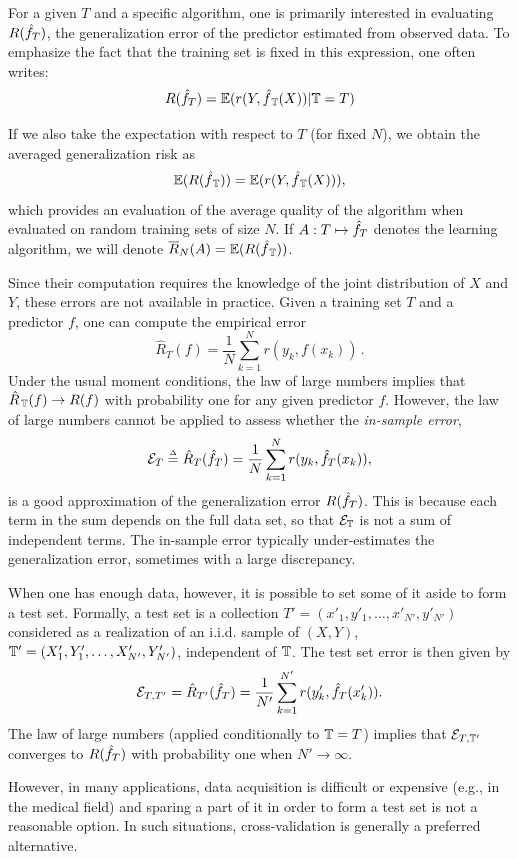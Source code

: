 For a given $T$ and a specific algorithm, one is primarily interested in evaluating $R({\hat{f}}_{T})$, the generalization error of the predictor estimated from observed data.  To emphasize the fact that the training set is fixed in this expression, one often writes:
\[
R({\hat{f}}_{T}) = \bm{\mathbb E}(r(Y, {\hat{f}}_{\,{\mathbb T}}(X)) | {\mathbb T} = T)
\]

If we  also take the expectation with respect to $T$ (for fixed $N$), we obtain the averaged generalization risk as
\[
\bm{\mathbb E}(R({\hat{f}}_{\,{\mathbb T}})) = \bm{\mathbb E}(r(Y, {\hat{f}}_{\,{\mathbb T}}(X))),
\]
which provides an evaluation of the average quality of the algorithm when evaluated on random training sets of size $N$.
If $A: T \mapsto {\hat{f}}_{T}$ denotes the learning algorithm, we will denote $\overline R_{N}(A) = \bm{\mathbb E}(R({\hat{f}}_{\,{\mathbb T}}))$.

Since their computation requires the knowledge of the joint distribution of $X$ and $Y$, these errors are not available in practice. Given a training set $T$ and a predictor $f$, one can compute the empirical error
\[
\hat R_T(f) = \frac{1}{N} \sum_{k=1}^N r(y_k, f(x_k))\,.
\]
Under the usual moment conditions, the law of large numbers implies that $\hat R_{\,{\mathbb T}}(f) \to R(f)$ with probability one for any given predictor $f$.  However, the law of large numbers cannot be applied to assess whether the {\em in-sample error},
\[
{\mathcal E}_T \stackrel{{\scriptscriptstyle \Delta}}{=} \hat R_T({\hat{f}}_T) = \frac{1}{N} \sum_{k=1}^N r(y_k, {\hat{f}}_T(x_k)),
\]
is a good approximation of the generalization error $R({\hat{f}}_T)$. This is because each term in the sum depends on the full data set, so that ${\mathcal E}_{\mathbb T}$ is not a sum of independent terms. The in-sample error typically under-estimates the generalization error, sometimes with a large discrepancy.

When one has enough data, however, it is possible to set some of it aside to form a test set.
Formally, a test set is a collection $T' = (x'_1, y'_1, \ldots, x'_{N'}, y'_{N'})$ considered as a realization  of an i.i.d. sample of $(X,Y)$, ${\mathbb T}' = (X'_1, Y'_1, \ldots, X'_{N'}, Y'_{N'})$, independent of ${\mathbb T}$.
 The test set error is then given by
\[
{\mathcal E}_{T, T'}  = \hat  R_{T'}({\hat{f}}_T) = \frac{1}{N'} \sum_{k=1}^{N'} r(y'_k, {\hat{f}}_T(x'_k)).
\]
The law of large numbers (applied conditionally to ${\mathbb T} = T$) implies that ${\mathcal E}_{T,{\mathbb T}'}$ converges to $R({\hat{f}}_{T})$ with probability one when $N'\to \infty$.

However, in many applications, data acquisition is difficult or expensive (e.g., in the medical field) and sparing a part of it in order to form a test set is not a reasonable option. In such situations, cross-validation is generally a preferred alternative.


